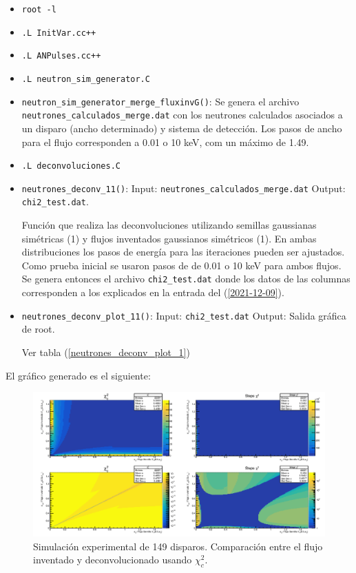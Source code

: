 \documentclass[11pt,letterpaper]{article}
\begin{document}
\begin{itemize}
\item \verb|root -l|
\item \verb|.L InitVar.cc++|
\item \verb|.L ANPulses.cc++|
\item \verb|.L neutron_sim_generator.C|
\item \verb|neutron_sim_generator_merge_fluxinvG()|: Se genera el archivo \verb|neutrones_calculados_merge.dat| con los neutrones calculados asociados a un disparo (ancho determinado) y sistema de detección. Los pasos de ancho para el flujo corresponden a 0.01 o 10 keV, com un máximo de 1.49.
\item \verb|.L deconvoluciones.C|
\item \verb|neutrones_deconv_11()|: 
Input: \verb|neutrones_calculados_merge.dat| Output:  \verb|chi2_test.dat|.

Función que realiza las deconvoluciones utilizando semillas gaussianas simétricas (1) y flujos inventados gaussianos simétricos (1). En ambas distribuciones los pasos de energía para las iteraciones pueden ser ajustados. Como prueba inicial se usaron pasos de de 0.01 o 10 keV para ambos flujos. Se genera entonces el archivo \verb|chi2_test.dat| donde los datos de las columnas corresponden a los explicados en la entrada del (\ref{2021-12-09}).
\item \verb|neutrones_deconv_plot_11()|: Input: \verb|chi2_test.dat| Output: Salida gráfica de root.

Ver tabla (\ref{neutrones_deconv_plot_1})
\end{itemize}

El gráfico generado es el siguiente: 

\begin{figure}[H]
    \includegraphics[width=1.\textwidth]{img/chi2_test_1-149_fluxseed_G_fluxinv_G_11.png}
    \centering
     \cprotect\caption{Simulación experimental de 149 disparos. Comparación entre el flujo inventado y deconvolucionado usando $\chi_c^2$.}
\label{neutrones_deconv_plot_11}
\end{figure}
\end{document}
